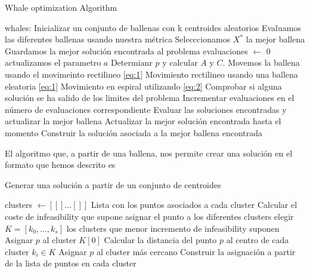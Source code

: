 \documentclass[11pt]{article}
\begin{document}
\begin{algorithm}[H]
  \caption{Whale optimization Algorithm}
  \label{alg-lsearch}
  \begin{algorithmic}[1]
    \State whales: Inicializar un conjunto de ballenas con k centroides aleatorios
    \State Evaluamos las diferentes ballenas usando nuestra métrica 
    \State Selecccionamos $X^*$ la mejor ballena
    \State Guardamos la mejor solución encontrada al problema
    \State evaluaciones $\leftarrow$ 0
    \State actualizamos el parametro $a$
    \State Determianr $p$ y calcular  $A$ y $C$.
    \State Movemos la ballena usando el movimeinto rectilineo \eqref{eq:1}
    \State Movimiento rectilineo usando una ballena eleatoria \eqref{eq:1}
    \EndIf
    \Else
    \State Movimiento en espiral utilizando \eqref{eq:2}
    \EndIf
    \EndFor 
    \State Comprobar si alguna solución se ha salido de los limites del problema
    \State Incrementar evaluaciones en el número de evaluaciones correspondiente
    \State Evaluar las soluciones encontradas y actualizar la mejor ballena 
    \State Actualizar la mejor solución encontrada hasta el momento
    \EndIf
    \EndWhile
    \State
    \Return Construir la solución asociada a la mejor ballena encontrada
    \EndProcedure
  \end{algorithmic}
\end{algorithm}

El algoritmo que, a partir de una ballena, nos permite crear una solución en el
formato que hemos descrito es 


\begin{algorithm}[H]
  \caption{Generar una solución a partir de un conjunto de centroides}
  \label{alg-lsearch}
  \begin{algorithmic}[1]
    \State clusters $\leftarrow [[]\dots[]]$  Lista con los puntos asociados a cada cluster
    \State Calcular el coste de infeasibility que supone asignar el punto a los diferentes clusters 
    \State elegir $K = [k_0,\dots,k_s]$ los clusters que menor incremento de infeasibility suponen
    \State Asignar $p$ al cluster $K[0]$
    \Else
    \State Calcular la distancia del punto $p$ al centro de cada cluster $k_i \in K$
    \State Asignar $p$ al cluster más cercano
    \EndIf
    \EndFor
    \State
    \Return Construir la asignación a partir de la lista de puntos en cada cluster
    \EndProcedure
  \end{algorithmic}
\end{algorithm}
\end{document}
